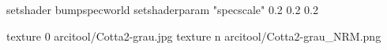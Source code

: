 setshader bumpspecworld
setshaderparam "specscale" 0.2 0.2 0.2

texture 0 arcitool/Cotta2-grau.jpg
texture n arcitool/Cotta2-grau_NRM.png
